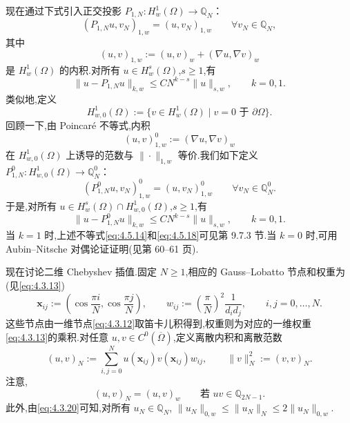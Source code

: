 现在通过下式引入正交投影 \(P_{1,N}\colon H_w^1(\Omega)\to\mathbb Q_N\)：
\begin{equation}\label{eq:4.5.12}
  (P_{1,N}u,v_N)_{1,w}=(u,v_N)_{1,w}\qquad\forall v_N\in\mathbb Q_N,
\end{equation}
其中
\begin{equation}\label{eq:4.5.13}
  (u,v)_{1,w}:=(u,v)_w+(\nabla u,\nabla v)_w
\end{equation}
是 \(H_w^1(\Omega)\) 的内积.对所有 \(u\in H_w^s(\Omega)\),\(s\ge1\),有
\begin{equation}\label{eq:4.5.14}
  \|u-P_{1,N}u\|_{k,w}\le CN^{k-s}\|u\|_{s,w},\qquad k=0,1.
\end{equation}
类似地,定义
\begin{equation}\label{eq:4.5.15}
  H^1_{w,0}(\Omega):=\{v\in H_w^1(\Omega)\mid v=0\text{ 于 }\partial\Omega\}.
\end{equation}
回顾一下,由 Poincaré 不等式,内积
\begin{equation}\label{eq:4.5.16}
  (u,v)^0_{1,w}:=(\nabla u,\nabla v)_w
\end{equation}
在 \(H^1_{w,0}(\Omega)\) 上诱导的范数与 \(\|\cdot\|_{1,w}\) 等价.我们如下定义 \(P_{1,N}^0\colon H^1_{w,0}(\Omega)\to\mathbb Q_N^0\)：
\begin{equation}\label{eq:4.5.17}
  (P_{1,N}^0u,v_N)^0_{1,w}=(u,v_N)^0_{1,w}\qquad\forall v_N\in\mathbb Q_N^0.
\end{equation}
于是,对所有 \(u\in H_w^s(\Omega)\cap H^1_{w,0}(\Omega)\),\(s\ge1\),有
\begin{equation}\label{eq:4.5.18}
  \|u-P_{1,N}^0u\|_{k,w}\le CN^{k-s}\|u\|_{s,w},\qquad k=0,1.
\end{equation}
当 \(k=1\) 时,上述不等式\eqref{eq:4.5.14}和\eqref{eq:4.5.18}可见第 9.7.3 节.当 \(k=0\) 时,可用 Aubin--Nitsche 对偶论证证明(见第 60–61 页).

现在讨论二维 Chebyshev 插值.固定 \(N\ge1\),相应的 Gauss--Lobatto 节点和权重为(见\eqref{eq:4.3.13})
\begin{equation}\label{eq:4.5.19}
  \boldsymbol{x}_{ij}:=\left(\cos\frac{\pi i}N,\cos\frac{\pi j}N\right),\qquad
  w_{ij}:=\left(\frac\pi N\right)^2\frac1{d_id_j},\qquad i,j=0,\ldots,N.
\end{equation}
这些节点由一维节点\eqref{eq:4.3.12}取笛卡儿积得到,权重则为对应的一维权重\eqref{eq:4.3.13}的乘积.对任意 \(u,v\in C^0(\overline\Omega)\),定义离散内积和离散范数
\begin{equation}\label{eq:4.5.20}
  (u,v)_N:=\sum_{i,j=0}^N u(\boldsymbol{x}_{ij})v(\boldsymbol{x}_{ij})w_{ij},\qquad
  \|v\|_N^2:=(v,v)_N.
\end{equation}
注意,
\begin{equation}\label{eq:4.5.21}
  (u,v)_N=(u,v)_w\qquad\text{若 }uv\in\mathbb Q_{2N-1}.
\end{equation}
此外,由\eqref{eq:4.3.20}可知,对所有 \(u_N\in\mathbb Q_N\),
\(\|u_N\|_{0,w}\le\|u_N\|_N\le2\|u_N\|_{0,w}\).

